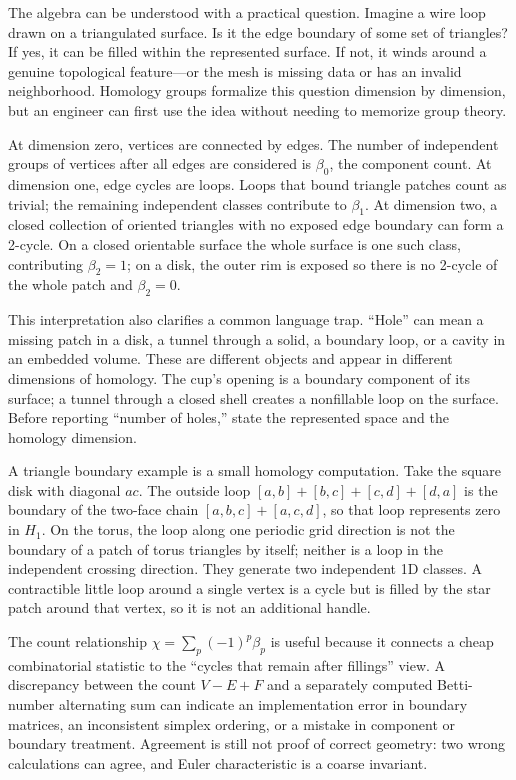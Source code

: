 The algebra can be understood with a practical question. Imagine a wire loop drawn on a triangulated surface. Is it the edge boundary of some set of triangles? If yes, it can be filled within the represented surface. If not, it winds around a genuine topological feature---or the mesh is missing data or has an invalid neighborhood. Homology groups formalize this question dimension by dimension, but an engineer can first use the idea without needing to memorize group theory.

At dimension zero, vertices are connected by edges. The number of independent groups of vertices after all edges are considered is \(\beta_0\), the component count. At dimension one, edge cycles are loops. Loops that bound triangle patches count as trivial; the remaining independent classes contribute to \(\beta_1\). At dimension two, a closed collection of oriented triangles with no exposed edge boundary can form a 2-cycle. On a closed orientable surface the whole surface is one such class, contributing \(\beta_2=1\); on a disk, the outer rim is exposed so there is no 2-cycle of the whole patch and \(\beta_2=0\).

This interpretation also clarifies a common language trap. ``Hole'' can mean a missing patch in a disk, a tunnel through a solid, a boundary loop, or a cavity in an embedded volume. These are different objects and appear in different dimensions of homology. The cup's opening is a boundary component of its surface; a tunnel through a closed shell creates a nonfillable loop on the surface. Before reporting ``number of holes,'' state the represented space and the homology dimension.

A triangle boundary example is a small homology computation. Take the square disk with diagonal \(ac\). The outside loop \([a,b]+[b,c]+[c,d]+[d,a]\) is the boundary of the two-face chain \([a,b,c]+[a,c,d]\), so that loop represents zero in \(H_1\). On the torus, the loop along one periodic grid direction is not the boundary of a patch of torus triangles by itself; neither is a loop in the independent crossing direction. They generate two independent 1D classes. A contractible little loop around a single vertex is a cycle but is filled by the star patch around that vertex, so it is not an additional handle.

The count relationship \(\chi=\sum_p(-1)^p\beta_p\) is useful because it connects a cheap combinatorial statistic to the ``cycles that remain after fillings'' view. A discrepancy between the count \(V-E+F\) and a separately computed Betti-number alternating sum can indicate an implementation error in boundary matrices, an inconsistent simplex ordering, or a mistake in component or boundary treatment. Agreement is still not proof of correct geometry: two wrong calculations can agree, and Euler characteristic is a coarse invariant.

